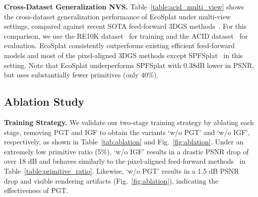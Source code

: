 
\noindent \textbf{Cross-Dataset Generalization NVS.}
% 
Table~\ref{table:acid_multi_view} shows the cross-dataset generalization performance of EcoSplat under multi-view settings, compared against recent SOTA feed-forward 3DGS methods~\cite{xu2025depthsplat, ye2024no, huang2025no, zhang2024gaussian, liu2025worldmirror, jiang2025anysplat}. For this comparison, we use the RE10K dataset~\cite{zhou2018stereo} for training and the ACID dataset~\cite{infinite_nature_2020} for evaluation.
EcoSplat consistently outperforms existing efficient feed-forward models and most of the pixel-aligned 3DGS methods except SPFSplat~\cite{huang2025no} in this setting. Note that EcoSplat underperforms SPFSplat with 0.38dB lower in PSNR, but uses substantially fewer primitives (only $40\%$). 


% 
\subsection{Ablation Study}


\noindent \textbf{Training Strategy.}  
We validate our two-stage training strategy by ablating each stage, removing PGT and IGF to obtain the variants `w/o PGT' and `w/o IGF', respectively, as shown in Table~\ref{tab:ablation} and Fig.~\ref{fig:ablation}.
Under an extremely low primitive ratio (5\%), `w/o IGF' results in a drastic PSNR drop of over 18 dB and behaves similarly to the pixel-aligned feed-forward methods~\cite{chen2024mvsplat, huang2025no} in Table~\ref{table:primitive_ratio}.
Likewise, `w/o PGT' results in a 1.5 dB PSNR drop and visible rendering artifacts (Fig.~\ref{fig:ablation}), indicating the effectiveness of PGT.

